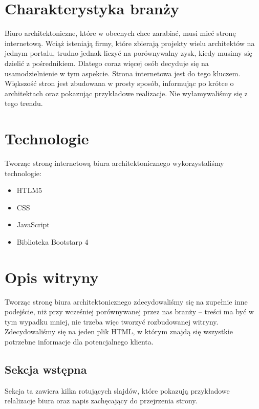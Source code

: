 \documentclass[a4paper,11pt]{article}
\begin{document}
\setcounter{page}{2}


\section {Charakterystyka branży}

Biuro architektoniczne, które w obecnych chce zarabiać, musi mieć stronę internetową. Wciąż isteniają firmy, które zbierają projekty wielu architektów na jednym portalu, trudno jednak liczyć na porównywalny zysk, kiedy musimy się dzielić z pośrednikiem. Dlatego coraz więcej osób decyduje się na usamodzielnienie w tym aspekcie. Strona internetowa jest do tego kluczem.  \\

Większość stron jest zbudowana w prosty sposób, informując po krótce o architektach oraz pokazując przykładowe realizacje. Nie wyłamywaliśmy się z tego trendu.


\section {Technologie}

Tworząc stronę internetową biura architektonicznego wykorzystaliśmy technologie:

\begin{itemize}
    \item HTLM5
    \item CSS
    \item JavaScript
    \item Biblioteka Bootstarp 4
\end{itemize}

\section {Opis witryny}

Tworząc stronę biura architektonicznego zdecydowaliśmy się na zupełnie inne podejście, niż przy wcześniej porównywanej przez nas branży – treści ma być w tym wypadku mniej, nie trzeba więc tworzyć rozbudowanej witryny. Zdecydowaliśmy się na jeden plik HTML, w którym znajdą się wszystkie potrzebne informacje dla potencjalnego klienta. 

\subsection {Sekcja wstępna}

Sekcja ta zawiera kilka rotujących slajdów, które pokazują przykładowe relalizacje biura oraz napis zachęcający do przejrzenia strony.  \\
\end{document}
